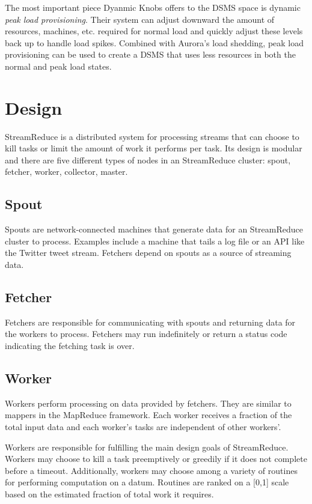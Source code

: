\documentclass[12pt,twocolumn]{article}
\begin{document}
The most important piece Dyanmic Knobs offers to the DSMS space is dynamic
\emph{peak load provisioning}. Their system can adjust downward the amount of resources,
machines, etc. required for normal load and quickly adjust these levels back up to
handle load spikes. Combined with Aurora's load shedding, peak load provisioning can
be used to create a DSMS that uses less resources in both the normal and peak load
states.

\section{Design}
\label{sec:design}
StreamReduce is a distributed system for processing streams that can choose to kill tasks or
limit the amount of work it performs per task. Its design is modular and there are five
different types of nodes in an StreamReduce cluster: spout, fetcher, worker, collector, master.
\subsection{Spout}
Spouts are network-connected machines that generate data for an StreamReduce cluster to process.
Examples include a machine that tails a log file or an API like the Twitter tweet
stream. Fetchers depend on spouts as a source of streaming data.
\subsection{Fetcher}
Fetchers are responsible for communicating with spouts and returning data for the
workers to process. Fetchers may run indefinitely or return a status code indicating
the fetching task is over.
\subsection{Worker}
Workers perform processing on data provided by fetchers. They are similar to mappers
in the MapReduce framework. Each worker receives a fraction of the total input data
and each worker's tasks are independent of other workers'.

Workers are responsible for fulfilling the main design goals of StreamReduce. Workers may choose
to kill a task preemptively or greedily if it does not complete before a timeout. Additionally,
workers may choose among a variety of routines for performing computation on a datum.
Routines are ranked on a [0,1] scale based on the estimated fraction of total work it
requires.
\end{document}
